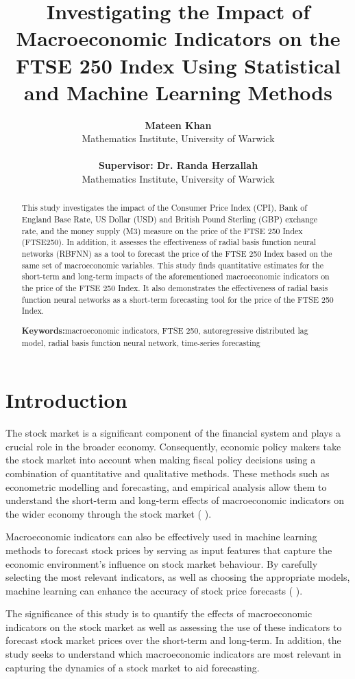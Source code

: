 \documentclass[11pt,a4paper]{article}
\title{{Investigating the Impact of Macroeconomic Indicators
on the FTSE 250 Index Using Statistical and Machine Learning Methods}}
\author{
  \textbf{Mateen Khan} \\
  Mathematics Institute, University of Warwick  \\ 
  \\
  \textbf{Supervisor: Dr. Randa Herzallah} \\
  Mathematics Institute, University of Warwick
}
\providecommand{\keywordname}{\textbf{Keywords:}} %
\newcommand{\keywords}[1]{%
  \par\addvspace{\baselineskip}%
  \noindent\keywordname\enspace\ignorespaces#1 %
}
\newcommand{\citeboth}[1]{\citeauthor{#1} \citep{#1}}
\begin{document}
\maketitle

\begin{abstract}
    This study investigates the impact of the Consumer Price Index (CPI), Bank of England Base Rate, US Dollar (USD) and British Pound Sterling (GBP) exchange rate, and the money supply (M3) measure on the price of the FTSE 250 Index (FTSE250).
    In addition, it assesses the effectiveness of radial basis function neural networks (RBFNN) as a tool to forecast the price of the FTSE 250 Index based on the same set of macroeconomic variables. This study finds quantitative estimates for the short-term and long-term impacts of the aforementioned macroeconomic indicators on the price of the FTSE 250 Index. It also demonstrates the effectiveness of radial basis function neural networks as a short-term forecasting tool for the price of the FTSE 250 Index.
    \keywords{macroeconomic indicators, FTSE 250, autoregressive distributed lag model, radial basis function neural network, time-series forecasting}
\end{abstract}

\section{Introduction}

The stock market is a significant component of the financial system and 
plays a crucial role in the broader economy. Consequently, economic policy 
makers take the stock market into account when making fiscal policy 
decisions using a combination of quantitative and qualitative methods. 
These methods such as econometric modelling and forecasting, and empirical 
analysis allow them to understand the short-term and long-term effects of 
macroeconomic indicators
on the wider economy through the stock market (\citeboth{DemirgucKunt1996}).

Macroeconomic indicators can also be effectively used in machine learning 
methods to forecast stock prices by serving as input features that capture 
the economic environment’s influence on stock market behaviour. By carefully 
selecting the most relevant indicators, 
as well as choosing the appropriate models, machine learning can enhance the accuracy of stock price forecasts (\citeboth{Prasad2023}).

The significance of this study is to quantify the effects of macroeconomic indicators on the stock market as well as assessing the use of these indicators to forecast stock market prices over the short-term and long-term. In addition, the study seeks to understand which macroeconomic indicators are most relevant in capturing the dynamics of a stock market to aid forecasting.
\end{document}
